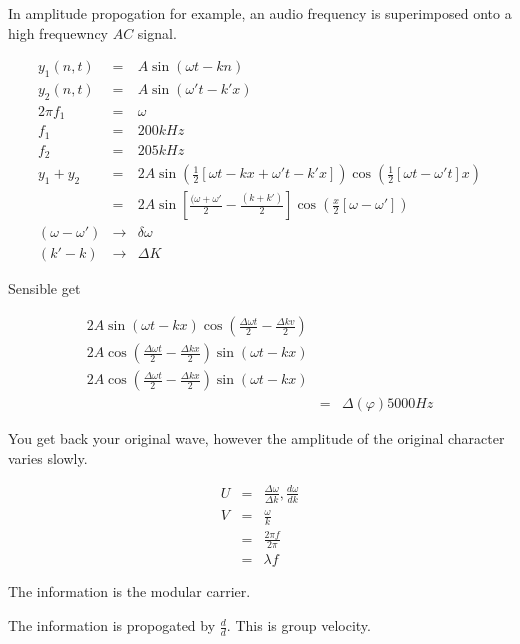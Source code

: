 \documentclass[a4paper,12pt]{article}
\begin{document}
In amplitude propogation for example, an audio frequency is superimposed
onto a high frequewncy $AC$  signal.

\begin{eqnarray*}
y_{1} (n, t) & = & A \sin{\left( \omega t - k n \right)} \\
y_{2} (n, t) & = & A \sin{\left( \omega' t - k' x \right)} \\
2 \pi f_{1} & = & \omega \\
f_{1} & = &  200 kHz \\
f_{2} & = & 205kHz \\
y_{1} + y_{2} & = & 2 A \sin{\left( \frac{1}{2} \left[ \omega t - kx +
\omega' t - k' x\right] \right)} \cos{ \left( \frac{1}{2} \left[ \omega
t - \omega' t \right] x \right)} \\
& = & 2 A \sin{\left[ \frac{( \omega + \omega'}{2} - \frac{(k + k')}{2}
\right]} \cos{\left( \frac{x}{2} \left[ \omega - \omega' \right]
\right)} \\
(\omega - \omega') & \to & \delta \omega \\
(k' - k) & \to & \Delta K
\end{eqnarray*}

Sensible get

\begin{eqnarray*}
2 A \sin{\left( \omega t - k x \right)} \cos{\left( \frac{ \Delta \omega
t}{2} - \frac{\Delta k v}{2} \right)} \\
2 A \cos{ \left( \frac{\Delta \omega t}{2} - \frac{\Delta k x}{2}
\right)} \sin{\left( \omega t - k x \right)} \\
2 A \cos{\left( \frac{\Delta \omega t}{2} - \frac{\Delta kx}{2} \right)}
\sin{\left( \omega t - k x \right)} \\
& = & \Delta (\varphi) 5000 Hz
\end{eqnarray*}

You get back your original wave, however the amplitude of the original
character varies slowly.

\begin{eqnarray*}
U & = & \frac{\Delta \omega}{\Delta k}, \frac{ d \omega}{d k} \\
V & = & \frac{\omega}{k} \\
  & = & \frac{2 \pi f}{2 \pi} \\
  & = & \lambda f
\end{eqnarray*}

The information is the modular carrier.

The information is propogated by $\frac{d }{d }$. This is group
velocity.
\end{document}
